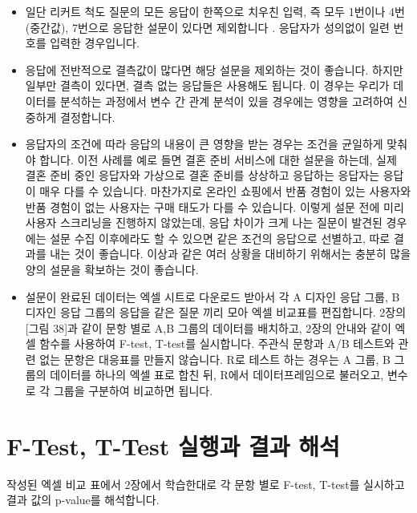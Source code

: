 \documentclass[
  letterpaper,
]{book}
\providecommand{\tightlist}{%
  \setlength{\itemsep}{0pt}\setlength{\parskip}{0pt}}\usepackage{longtable,booktabs,array}
\begin{document}
\begin{itemize}
\tightlist
\item
  일단 리커트 척도 질문의 모든 응답이 한쪽으로 치우친 입력, 즉 모두
  1번이나 4번(중간값), 7번으로 응답한 설문이 있다면 제외합니다 .
  응답자가 성의없이 일련 번호를 입력한 경우입니다.
\item
  응답에 전반적으로 결측값이 많다면 해당 설문을 제외하는 것이 좋습니다.
  하지만 일부만 결측이 있다면, 결측 없는 응답들은 사용해도 됩니다. 이
  경우는 우리가 데이터를 분석하는 과정에서 변수 간 관계 분석이 있을
  경우에는 영향을 고려하여 신중하게 결정합니다.
\item
  응답자의 조건에 따라 응답의 내용이 큰 영향을 받는 경우는 조건을
  균일하게 맞춰야 합니다. 이전 사례를 예로 들면 결혼 준비 서비스에 대한
  설문을 하는데, 실제 결혼 준비 중인 응답자와 가상으로 결혼 준비를
  상상하고 응답하는 응답자는 응답이 매우 다를 수 있습니다. 마찬가지로
  온라인 쇼핑에서 반품 경험이 있는 사용자와 반품 경험이 없는 사용자는
  구매 태도가 다를 수 있습니다. 이렇게 설문 전에 미리 사용자 스크리닝을
  진행하지 않았는데, 응답 차이가 크게 나는 질문이 발견된 경우에는 설문
  수집 이후에라도 할 수 있으면 같은 조건의 응답으로 선별하고, 따로
  결과를 내는 것이 좋습니다. 이상과 같은 여러 상황을 대비하기 위해서는
  충분히 많을 양의 설문을 확보하는 것이 좋습니다.
\item
  설문이 완료된 데이터는 엑셀 시트로 다운로드 받아서 각 A 디자인 응답
  그룹, B 디자인 응답 그룹의 응답을 같은 질문 끼리 모아 엑셀 비교표를
  편집합니다. 2장의 {[}그림 38{]}과 같이 문항 별로 A,B 그룹의 데이터를
  배치하고, 2장의 안내와 같이 엑셀 함수를 사용하여 F-test, T-test를
  실시합니다. 주관식 문항과 A/B 테스트와 관련 없는 문항은 대응표를
  만들지 않습니다. R로 테스트 하는 경우는 A 그룹, B 그룹의 데이터를
  하나의 엑셀 표로 합친 뒤, R에서 데이터프레임으로 불러오고, 변수로 각
  그룹을 구분하여 비교하면 됩니다.
\end{itemize}

\section{F-Test, T-Test 실행과 결과
해석}\label{f-test-t-test-uxc2e4uxd589uxacfc-uxacb0uxacfc-uxd574uxc11d}

작성된 엑셀 비교 표에서 2장에서 학습한대로 각 문항 별로 F-test, T-test를
실시하고 결과 값의 p-value를 해석합니다.
\end{document}
